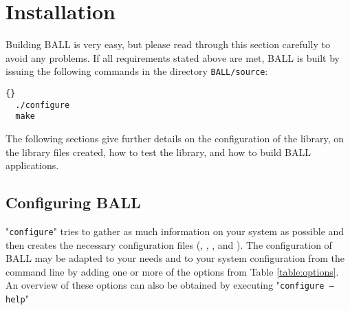 \section{Installation}
\label{section:building-ball}

Building BALL is very easy, but please read through this section carefully to
avoid any problems.  If all requirements stated above are met, BALL is built
by issuing the following commands in the directory {\tt BALL/source}:

\begin{lstlisting}{}
  ./configure
  make
\end{lstlisting}

The following sections give further details on the configuration of the library,
on the library files created, how to test the library, and how to build BALL 
applications.

\subsection{Configuring BALL}

"{\tt configure}" tries to gather as much information on your system as possible and 
then creates the necessary configuration files (,
, , and ).
The configuration of BALL may be adapted to your needs and to your system
configuration from the command line by adding one or more of the options from
Table \ref{table:options}.
An overview of these options can also be obtained by executing "{\tt configure
--help}"

